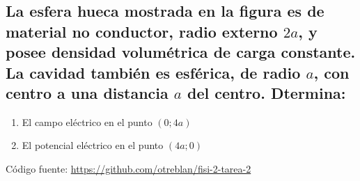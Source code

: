 \documentclass[10pt, twoside]{article}
\begin{document}
\subsection*{La esfera hueca mostrada en la figura es de material no conductor,
radio externo $2a$, y posee densidad volumétrica de carga constante.
La cavidad también es esférica, de radio $a$, con centro a una distancia
$a$ del centro. Dtermina:}%
\begin{enumerate}[label=\textbf{\alph*)}]
	\item El campo eléctrico en el punto $(0;4a)$
	\item El potencial eléctrico en el punto $(4a;0)$
\end{enumerate}
\vfill
Código fuente: \url{https://github.com/otreblan/fisi-2-tarea-2}
\end{document}
